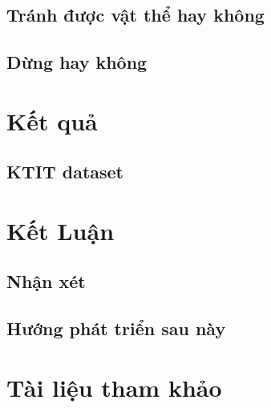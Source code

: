 \documentclass[a4paper,10pt]{article}
\begin{document}
	\subsection{Tránh được vật thể hay không}
	\subsection{Dừng hay không}
\section{Kết quả}
    \subsection{KTIT dataset}
\section{Kết Luận}
    \subsection{Nhận xét}
    \subsection{Hướng phát triển sau này}
\section{Tài liệu tham khảo}
\end{document}
